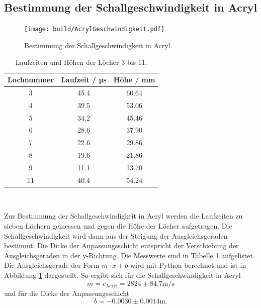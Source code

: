 \subsection{Bestimmung der Schallgeschwindigkeit in Acryl}
\label{sec:Schallgeschwindigkeit}

\begin{figure}[!ht]
    \centering
    \texttt{[image: build/AcrylGeschwindigkeit.pdf]}
    \caption{Bestimmung der Schallgeschwindigkeit in Acryl.}
    \label{fig:AkryllGeschwindigkeit}
\end{figure}

\begin{table}
    \centering
    \begin{tabular}{|c|c|c|}
        \toprule
        {Lochnummer} & {Laufzeit / µs} & {Höhe / mm} \\
        \midrule
        3 & 45.4 & 60.64\\
        4 & 39.5 & 53.06\\
        5 & 34.2 & 45.46\\
        6 & 28.6 & 37.90\\
        7 & 22.6 & 29.86\\
        8 & 19.6 & 21.86\\
        9 & 11.1 & 13.70\\
        11 & 40.4 & 54.24\\
        \bottomrule
    \end{tabular}\
    \caption{Laufzeiten und Höhen der Löcher 3 bis 11.}
    \label{tab:Schallgeschwindigkeit}
\end{table}

Zur Bestimmung der Schallgeschwindigkeit in Acryl werden die Laufzeiten zu sieben Löchern gemessen und gegen
die Höhe der Löcher aufgetragen. Die Schallgeschwindigkeit wird dann aus der Steigung der Ausgleichsgeraden bestimmt.
Die Dicke der Anpassungsschicht entspricht der Verschiebung der Ausgleichsgeraden in der y-Richtung.
Die Messwerte sind in Tabelle \ref{tab:Schallgeschwindigkeit} aufgelistet.
Die Ausgleichsgerade der Form $m\cdot x + b$ wird mit Python berechnet und ist in Abbildung \ref{fig:AkryllGeschwindigkeit} dargestellt.
So ergibt sich für die Schallgeschwindigkeit in Acryl
\begin{equation*}
    m = c_\text{Acryl} = 2824 ± 84.7 \si{\meter\per\second}
\end{equation*}
und für die Dicke der Anpassungsschicht
\begin{equation*}
    b = -0.0030 ± 0.0014 \si{\meter}.
\end{equation*}

